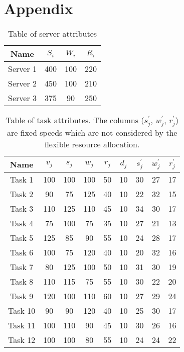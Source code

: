 \section*{Appendix}
\begin{table}[h]
    \begin{tabular}{|c|c|c|c|}
        \hline
        Name     & $S_i$ & $W_i$ & $R_i$ \\ [0.5ex] \hline
        Server 1 & 400   & 100   & 220   \\ \hline
        Server 2 & 450   & 100   & 210   \\ \hline
        Server 3 & 375   & 90    & 250   \\ \hline
    \end{tabular}
    \caption{Table of server attributes}
    \label{tab:example-servers-properties}
\end{table}

\begin{table}[h]
    \begin{tabular}{|c|c|c|c|c|c|c|c|c|}
        \hline
        Name    & $v_j$ & $s_j$ & $w_j$ & $r_j$ & $d_j$ & $s^{'}_j$ & $w^{'}_j$ & $r^{'}_j$ \\ [0.5ex] \hline
        Task 1  & 100   & 100   & 100   & 50    & 10    & 30        & 27        & 17        \\ \hline
        Task 2  & 90    & 75    & 125   & 40    & 10    & 22        & 32        & 15        \\ \hline
        Task 3  & 110   & 125   & 110   & 45    & 10    & 34        & 30        & 17        \\ \hline
        Task 4  & 75    & 100   & 75    & 35    & 10    & 27        & 21        & 13        \\ \hline
        Task 5  & 125   & 85    & 90    & 55    & 10    & 24        & 28        & 17        \\ \hline
        Task 6  & 100   & 75    & 120   & 40    & 10    & 20        & 32        & 16        \\ \hline
        Task 7  & 80    & 125   & 100   & 50    & 10    & 31        & 30        & 19        \\ \hline
        Task 8  & 110   & 115   & 75    & 55    & 10    & 30        & 22        & 20        \\ \hline
        Task 9  & 120   & 100   & 110   & 60    & 10    & 27        & 29        & 24        \\ \hline
        Task 10 & 90    & 90    & 120   & 40    & 10    & 25        & 30        & 17        \\ \hline
        Task 11 & 100   & 110   & 90    & 45    & 10    & 30        & 26        & 16        \\ \hline
        Task 12 & 100   & 100   & 80    & 55    & 10    & 24        & 24        & 22        \\ \hline
    \end{tabular}
    \caption{Table of task attributes. The columns ($s^{'}_j$, $w^{'}_j$, $r^{'}_j$) are fixed speeds which are not
    considered by the flexible resource allocation.}
    \label{tab:example-tasks-properties}
\end{table}